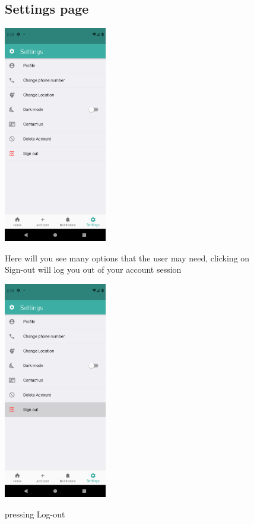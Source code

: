 \documentclass[12pt]{article}
\begin{document}
  \begin{figure}[h!]
  \subsection*{Settings page}
{\includegraphics[width=0.4\textwidth]{./Screenshots/17.PNG}}
  \caption{Here will you see many options that the user may need, clicking on Sign-out will log you out of your account session}
  \end{figure}
  \begin{figure}[h!]
{\includegraphics[width=0.4\textwidth]{./Screenshots/18.PNG}}
  \caption{pressing Log-out}
  \end{figure}  
\end{document}
